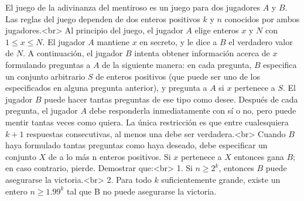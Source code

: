 El juego de la adivinanza del mentiroso es un juego para dos jugadores $A$ y $B$. Las reglas del juego dependen de dos enteros positivos $k$ y $n$ conocidos por ambos jugadores.<br>
Al principio del juego, el jugador $A$ elige enteros $x$ y $N$ con $1 \leq x \leq N$. El jugador $A$ mantiene $x$ en secreto, y le dice a $B$ el verdadero valor de $N$. A continuación, el jugador $B$ intenta obtener información acerca de $x$ formulando preguntas a $A$ de la siguiente manera: en cada pregunta, $B$ especifica un conjunto arbitrario $S$ de enteros positivos (que puede ser uno de los especificados en alguna pregunta anterior), y pregunta a $A$ si $x$ pertenece a $S$. El jugador $B$ puede hacer tantas preguntas de ese tipo como desee. Después de cada pregunta, el jugador $A$ debe responderla inmediatamente con sí o no, pero puede mentir tantas veces como quiera. La única restricción es que entre cualesquiera $k + 1$ respuestas consecutivas, al menos una debe ser verdadera.<br>
Cuando $B$ haya formulado tantas preguntas como haya deseado, debe especificar un conjunto $X$ de a lo más n enteros positivos. Si $x$ pertenece a $X$ entonces gana $B$; en caso contrario, pierde. Demostrar que:<br>
1. Si $n \geq 2^k$, entonces $B$ puede asegurarse la victoria.<br>
2. Para todo $k$ suficientemente grande, existe un entero $n \geq 1.99^k$ tal que B no puede asegurarse la victoria.